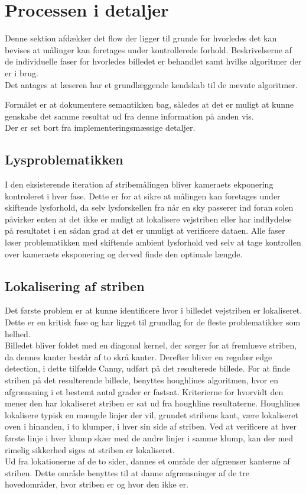 \section{Processen i detaljer}

Denne sektion afdækker det flow der ligger til grunde for hvorledes det kan bevises at målinger kan foretages under kontrollerede forhold. Beskrivelserne af de individuelle faser for hvorledes billedet er behandlet samt hvilke algoritmer der er i brug.\\Det antages at læseren har et grundlæggende kendskab til de nævnte algoritmer.

Formålet er at dokumentere semantikken bag, således at det er muligt at kunne genskabe det samme resultat ud fra denne information på anden vis.\\
Der er set bort fra implementeringsmæssige detaljer.

\subsection{Lysproblematikken}
I den eksisterende iteration af stribemålingen bliver kameraets ekponering kontroleret i hver fase. Dette er for at sikre at målingen kan foretages under skiftende lysforhold, da selv lysforskellen fra når en sky passerer ind foran solen påvirker enten at det ikke er muligt at lokalisere vejstriben eller har indflydelse på resultatet i en sådan grad at det er umuligt at verificere dataen.
Alle faser løser problematikken med skiftende ambient lysforhold ved selv at tage kontrollen over kameraets eksponering og derved finde den optimale længde.\\

\subsection{Lokalisering af striben\label{ref::stribefind}}
Det første problem er at kunne identificere hvor i billedet vejstriben er lokaliseret. Dette er en kritisk fase og har ligget til grundlag for de fleste problematikker som helhed.
\\
Billedet bliver foldet med en diagonal kernel, der sørger for at fremhæve striben, da dennes kanter består af to skrå kanter.
Derefter bliver en regulær edge detection, i dette tilfælde Canny, udført på det resulterede billede. For at finde striben på det resulterende billede, benyttes houghlines algoritmen, hvor en afgrænsning i et bestemt antal grader er fastsat. Kriterierne for hvorvidt den mener den har lokaliseret striben er sat ud fra houghline resultaterne. Houghlines lokalisere typisk en mængde linjer der vil, grundet stribens kant, være lokaliseret oven i hinanden, i to klumper, i hver sin side af striben.
Ved at verificere at hver første linje i hver klump skær med de andre linjer i samme klump, kan der med rimelig sikkerhed siges at striben er lokaliseret.
\\
Ud fra lokationerne af de to sider, dannes et område der afgrænser kanterne af striben. Dette område benyttes til at danne afgrænsninger af de tre hovedområder, hvor striben er og hvor den ikke er.

